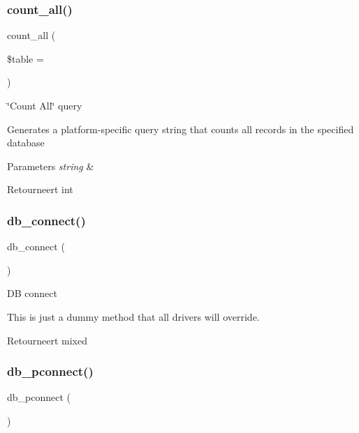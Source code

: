 \subsubsection{\texorpdfstring{count\_all()}{count\_all()}}
{\footnotesize\ttfamily count\+\_\+all (\begin{DoxyParamCaption}\item[{}]{\$table = {\ttfamily \textquotesingle{}\textquotesingle{}} }\end{DoxyParamCaption})}

\char`\"{}\+Count All\char`\"{} query

Generates a platform-\/specific query string that counts all records in the specified database


\begin{DoxyParams}{Parameters}
{\em string} & \\
\hline
\end{DoxyParams}
\begin{DoxyReturn}{Retourneert}
int 
\end{DoxyReturn}
\mbox{\label{class_c_i___d_b__driver_a6aa545dcb7768f0b62d37cdcf7f09adc}} 
\subsubsection{\texorpdfstring{db\_connect()}{db\_connect()}}
{\footnotesize\ttfamily db\+\_\+connect (\begin{DoxyParamCaption}{ }\end{DoxyParamCaption})}

DB connect

This is just a dummy method that all drivers will override.

\begin{DoxyReturn}{Retourneert}
mixed 
\end{DoxyReturn}
\mbox{\label{class_c_i___d_b__driver_a0f69e662bd02de5bcf98647068e7c653}} 
\subsubsection{\texorpdfstring{db\_pconnect()}{db\_pconnect()}}
{\footnotesize\ttfamily db\+\_\+pconnect (\begin{DoxyParamCaption}{ }\end{DoxyParamCaption})}

